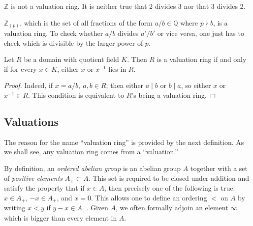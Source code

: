\begin{example} 
$\mathbb{Z}$ is not a valuation ring. It is neither true that  2 divides 3
nor that 3 divides 2.
\end{example} 

\begin{example} 
$\mathbb{Z}_{(p)}$, which is the set of all fractions of the form $a/b \in
\mathbb{Q}$ where $p \nmid b$, is a valuation ring. To check whether $a/b$
divides $a'/b'$ or vice versa, one  just has to check which is divisible by
the larger power of $p$. 
\end{example} 

\begin{proposition} 
Let $R$ be a domain with quotient field $K$. Then $R$ is a valuation ring if
and only if for every $x \in K$, either $x$ or $x^{-1}$ lies in $R$.
\end{proposition} 

\begin{proof} Indeed, if $x=a/b , \ a,b \in R$, then either $a \mid
b$ or $b \mid a$, so either $x$ or $x^{-1} \in R$. This condition is equivalent
to $R$'s being a valuation ring.
\end{proof}


\subsection{Valuations}
The reason for the name ``valuation ring'' is provided by the next definition.
As we shall see, any valuation ring comes from a ``valuation.''

By definition, an \emph{ordered abelian group} is an abelian group $A$
together with a set of \emph{positive elements} $A_+ \subset A$. This set is
required to be closed under addition and satisfy the property that if $x \in
A$, then precisely one of the following is true: $x \in A_+$, $-x \in A_+$,
and $x = 0$. This allows one to define an ordering $<$ on $A$ by writing $x<y$
if $y-x \in A_+$.
Given $A$, we often formally adjoin an element $\infty$ which is bigger than
every element in $A$. 


